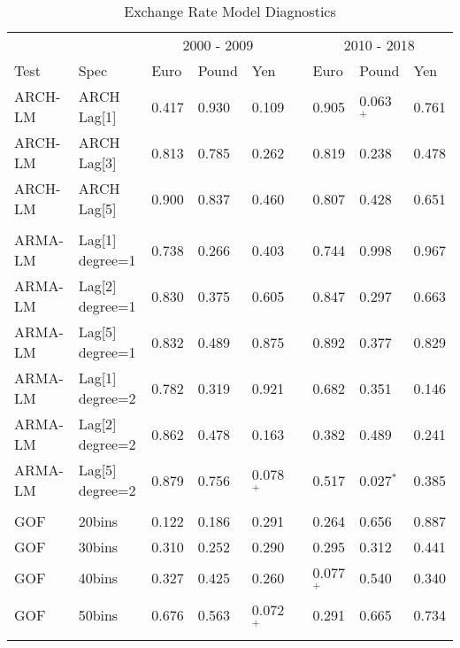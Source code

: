 \documentclass[12pt]{article}
\begin{document}
\begin{table}
	\fontsize{10pt}{10pt}\selectfont
	\caption{Exchange Rate Model Diagnostics}
	\begin{tabular}[c]{l l l l l c l l l}
		\midrule
                & & \multicolumn{3}{c}{2000 - 2009} & & \multicolumn{3}{c}{2010 - 2018} \\ \addlinespace[1mm]
		\cline{3-5} \cline{7-9}
    Test  & Spec                             & Euro  & Pound & Yen   & &  Euro & Pound & Yen   \\ \addlinespace[1mm]
		\midrule
  ARCH-LM &        ARCH Lag[1] & 0.417 & 0.930       & 0.109       & & 0.905       & 0.063$^{+}$ & 0.761       \\
  ARCH-LM &        ARCH Lag[3] & 0.813 & 0.785       & 0.262       & & 0.819       & 0.238       & 0.478       \\
  ARCH-LM &        ARCH Lag[5] & 0.900 & 0.837       & 0.460       & & 0.807       & 0.428       & 0.651       \\ \\
  ARMA-LM &    Lag[1] degree=1 & 0.738 & 0.266       & 0.403       & & 0.744       & 0.998       & 0.967       \\
  ARMA-LM &    Lag[2] degree=1 & 0.830 & 0.375       & 0.605       & & 0.847       & 0.297       & 0.663       \\
  ARMA-LM &    Lag[5] degree=1 & 0.832 & 0.489       & 0.875       & & 0.892       & 0.377       & 0.829       \\
  ARMA-LM &    Lag[1] degree=2 & 0.782 & 0.319       & 0.921       & & 0.682       & 0.351       & 0.146       \\
  ARMA-LM &    Lag[2] degree=2 & 0.862 & 0.478       & 0.163       & & 0.382       & 0.489       & 0.241       \\
  ARMA-LM &    Lag[5] degree=2 & 0.879 & 0.756       & 0.078$^{+}$ & & 0.517       & 0.027$^{*}$ & 0.385       \\ \\
      GOF &             20bins & 0.122 & 0.186       & 0.291       & & 0.264       & 0.656       & 0.887       \\
      GOF &             30bins & 0.310 & 0.252       & 0.290       & & 0.295       & 0.312       & 0.441       \\
      GOF &             40bins & 0.327 & 0.425       & 0.260       & & 0.077$^{+}$ & 0.540       & 0.340       \\
      GOF &             50bins & 0.676 & 0.563       & 0.072$^{+}$ & & 0.291       & 0.665       & 0.734       \\ \\

\end{tabular}
\end{table}
\end{document}

